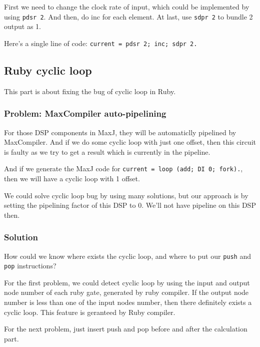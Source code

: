 First we need to change the clock rate of input, which could be implemented by using \texttt{pdsr 2}. And then, do inc for each element. At last, use \texttt{sdpr 2} to bundle 2 output as 1.

Here's a single line of code: \lstinline{current = pdsr 2; inc; sdpr 2.}

\subsection{Ruby cyclic loop}

This part is about fixing the bug of cyclic loop in Ruby.

\subsubsection{Problem: MaxCompiler auto-pipelining}

For those DSP components in MaxJ, they will be automaticlly pipelined by MaxCompiler. And if we do some cyclic loop with just one offset, then this circuit is faulty as we try to get a result which is currently in the pipeline.

And if we generate the MaxJ code for \lstinline{current = loop (add; DI 0; fork).}, then we will have a cyclic loop with 1 offset.

We could solve cyclic loop bug by using many solutions, but our approach is by setting the pipelining factor of this DSP to 0. We'll not have pipeline on this DSP then.

\subsubsection{Solution}

How could we know where exists the cyclic loop, and where to put our \texttt{push} and \texttt{pop} instructions? 

For the first problem, we could detect cyclic loop by using the input and output node number of each ruby gate, generated by ruby compiler. If the output node number is less than one of the input nodes number, then there definitely exists a cyclic loop. This feature is geranteed by Ruby compiler.

For the next problem, just insert push and pop before and after the calculation part.